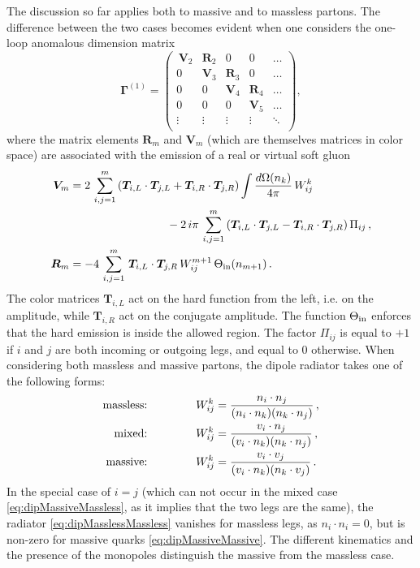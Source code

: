 \documentclass[11pt,a4paper]{article}
\begin{document}
The discussion so far applies both to massive and to massless partons. The difference between the two cases becomes evident when one considers the one-loop anomalous dimension matrix
\begin{equation}\label{eq:gammaOne}
\bm{\Gamma}^{(1)} =  \left(
\begin{array}{ccccc}
\, \bm{V}_{2} &   \bm{R}_{2} &  0 & 0 & \hdots \\
0 & \bm{V}_{3} & \bm{R}_{3}  & 0 & \hdots \\
0 &0  &  \bm{V}_{4} &  \bm{R}_{4} &   \hdots \\
0& 0& 0 &  \bm{V}_{5} & \hdots
\\
\vdots & \vdots & \vdots & \vdots &
\ddots \\
\end{array}
\right),
\end{equation}
where the matrix elements $\bm{R}_m$ and $\bm{V}_m$ (which are themselves matrices in color space) are  associated with the emission of a real or virtual soft gluon
\begin{align}
\bm{V}_m  &= 2\,\sum_{i,j=1}^m\,(\bm{T}_{i,L}\cdot  \bm{T}_{j,L}+\bm{T}_{i,R}\cdot  \bm{T}_{j,R})  \int \frac{d\Omega(n_k)}{4\pi}\, W_{ij}^k   \nonumber\\
&\hspace{3cm} - 2\, i \pi \,\sum_{i,j=1}^m \left(\bm{T}_{i,L}\cdot  \bm{T}_{j,L} - \bm{T}_{i,R}\cdot  \bm{T}_{j,R}\right) \Pi_{ij}\, 
, \label{eq:oneLoopRGvirt}\\
\bm{R}_m & = -4\,\sum_{i,j=1}^m\,\bm{T}_{i,L}\cdot\bm{T}_{j,R}  \,W_{ij}^{m+1}\,  \Theta_{\rm in}(n_{m+1})\label{eq:oneLoopRGreal}\,.
\end{align}
The color matrices $\bm{T}_{i,L}$ act on the hard function from the left, i.e. on the amplitude, while $\bm{T}_{i,R}$ act on the conjugate amplitude. The function $\Theta_{\rm in}$ enforces that the hard emission is inside the allowed region. The factor $\Pi_{ij}$ is equal to $+1$ if $i$ and $j$ are both incoming or outgoing legs, and equal to $0$ otherwise. When considering both massless and massive partons,  the dipole radiator takes one of the following forms: 
\begin{align}
\text{massless:}&\hspace{1.5cm}W_{ij}^k = \frac{n_i \cdot n_j}{(n_i \cdot n_k) (n_k \cdot n_j)}\label{eq:dipMasslessMassless} \, ,\\
\text{mixed:}&\hspace{1.5cm}W_{ij}^k = \frac{v_i \cdot n_j}{(v_i \cdot n_k) (n_k \cdot n_j)}\label{eq:dipMassiveMassless}\, ,\\
\text{massive:}&\hspace{1.5cm}W_{ij}^k = \frac{v_i \cdot v_j}{(v_i \cdot n_k) (n_k \cdot v_j)}\label{eq:dipMassiveMassive}\, .
\end{align}
In the special case of $i=j$ (which can not occur in the mixed case \eqref{eq:dipMassiveMassless}, as it implies that the two legs are the same), the radiator  \eqref{eq:dipMasslessMassless} vanishes for massless legs, as $n_i\cdot n_i=0$, but is non-zero for massive quarks \eqref{eq:dipMassiveMassive}. The different kinematics and the presence of the monopoles distinguish the massive from the massless case. 
\end{document}
